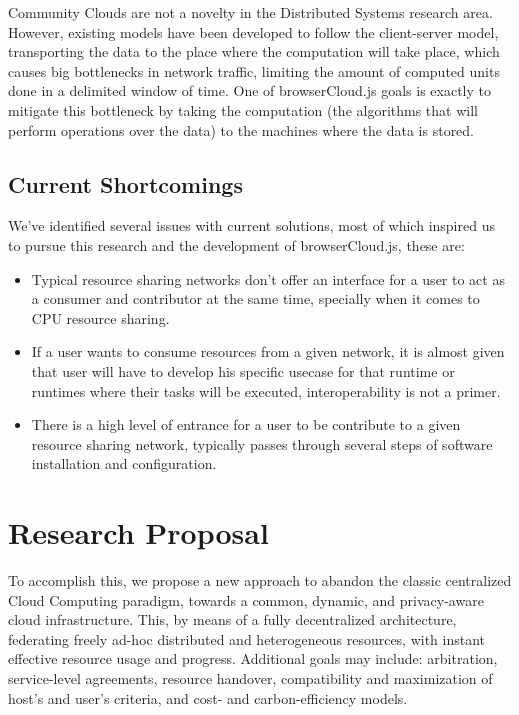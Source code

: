 Community Clouds are not a novelty in the Distributed Systems research area. However, existing models have been developed to follow the client-server model, transporting the data to the place where the computation will take place, which causes big bottlenecks in network traffic, limiting the amount of computed units done in a delimited window of time. One of browserCloud.js goals is exactly to mitigate this bottleneck by taking the computation (the algorithms that will perform operations over the data) to the machines where the data is stored.

\subsection{Current Shortcomings}

We've identified several issues with current solutions, most of which inspired us to pursue this research and the development of browserCloud.js, these are:

\begin{itemize}
    \item Typical resource sharing networks don't offer an interface for a user to act as a consumer and contributor at the same time, specially when it comes to CPU resource sharing.
    \item If a user wants to consume resources from a given network, it is almost given that user will have to develop his specific usecase for that runtime or runtimes where their tasks will be executed, interoperability is not a primer.
    \item There is a high level of entrance for a user to be contribute to a given resource sharing network, typically passes through several steps of software installation and configuration.
\end{itemize}

\section{Research Proposal}

To accomplish this, we propose a new approach to abandon the classic centralized Cloud Computing paradigm, towards a common, dynamic, and privacy-aware cloud infrastructure. This, by means of a fully decentralized architecture, federating freely ad-hoc distributed and heterogeneous resources, with instant effective resource usage and progress. Additional goals may include: arbitration, service-level agreements, resource handover, compatibility and maximization of host's and user's criteria, and cost- and carbon-efficiency models.

